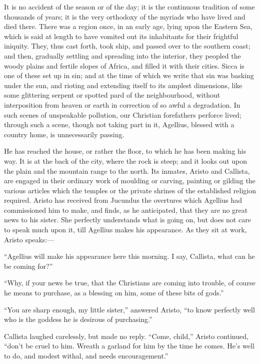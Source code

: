 It is no accident of the season or of the day; it is the continuous
tradition of some thousands of years; it is the very orthodoxy of the
myriads who have lived and died there. There was a region once,
in an early age, lying upon the Eastern Sea, which is said at length
to have vomited out its inhabitants for their frightful iniquity.
They, thus cast forth, took ship, and passed over to the southern
coast; and then, gradually settling and spreading into the interior,
they peopled the woody plains and fertile slopes of Africa, and filled
it with their cities. Sicca is one of these set up in sin; and at the
time of which we write that sin was basking under the sun, and rioting
and extending itself to its amplest dimensions, like some glittering
serpent or spotted pard of the neighbourhood, without interposition
from heaven or earth in correction of so awful a degradation. In such
scenes of unspeakable pollution, our Christian forefathers perforce
lived; through such a scene, though not taking part in it, Agellius,
blessed with a country home, is unnecessarily passing.

He has reached the house, or rather the floor, to which he has been
making his way. It is at the back of the city, where the rock is
steep; and it looks out upon the plain and the mountain range to the
north. Its inmates, Aristo and Callista, are engaged in their ordinary
work of moulding or carving, painting or gilding the various articles
which the temples or the private shrines of the established religion
required. Aristo has received from Jucundus the overtures which
Agellius had commissioned him to make, and finds, as he anticipated,
that they are no great news to his sister. She perfectly understands
what is going on, but does not care to speak much upon it, till
Agellius makes his appearance. As they sit at work, Aristo speaks:—

``Agellius will make his appearance here this morning. I say,
Callista, what can he be coming for?''

``Why, if your news be true, that the Christians are coming
into trouble, of course he means to purchase, as a blessing on him,
some of these bits of gods.''

``You are sharp enough, my little sister,'' answered Aristo,
``to know perfectly well who is the goddess he is desirous of
purchasing.''

Callista laughed carelessly, but made no reply. ``Come,
child,'' Aristo continued, ``don't be cruel to him. Wreath a
garland for him by the time he comes. He's well to do, and modest
withal, and needs encouragement.''

